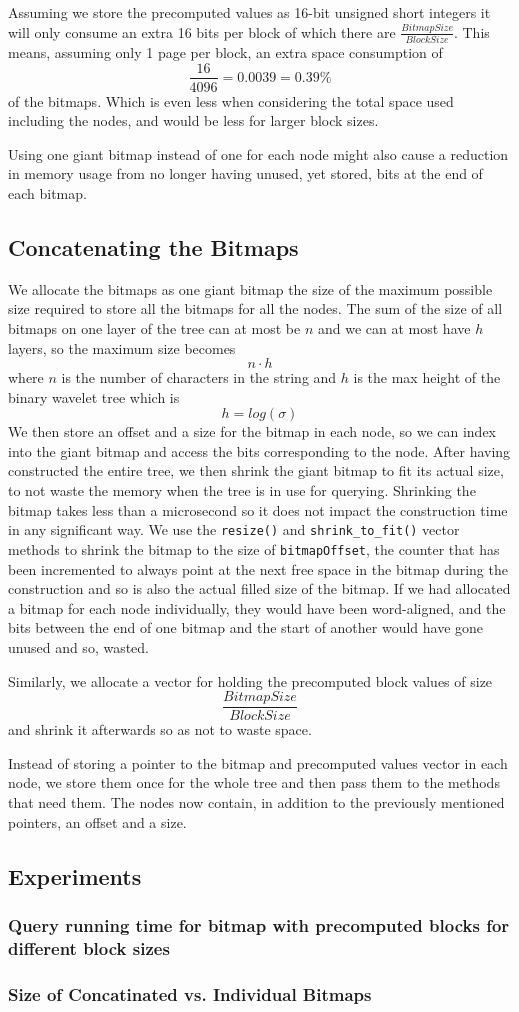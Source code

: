 Assuming we store the precomputed values as 16-bit unsigned short integers it will only consume an extra 16 bits per block of which there are $\frac{BitmapSize}{BlockSize}$.
This means, assuming only 1 page per block, an extra space consumption of
\[ \frac{16}{4096} = 0.0039 = 0.39\% \]
of the bitmaps.
Which is even less when considering the total space used including the nodes, and would be less for larger block sizes.

Using one giant bitmap instead of one for each node might also cause a reduction in memory usage from no longer having unused, yet stored, bits at the end of each bitmap.




\subsection{Concatenating the Bitmaps}
We allocate the bitmaps as one giant bitmap the size of the maximum possible size required to store all the bitmaps for all the nodes. The sum of the size of all bitmaps on one layer of the tree can at most be $n$ and we can at most have $h$ layers, so the maximum size becomes
\[n \cdot h\]
where $n$ is the number of characters in the string and $h$ is the max height of the binary wavelet tree which is
\[ h = log(\sigma) \]
We then store an offset and a size for the bitmap in each node, so we can index into the giant bitmap and access the bits corresponding to the node.
After having constructed the entire tree, we then shrink the giant bitmap to fit its actual size, to not waste the memory when the tree is in use for querying. Shrinking the bitmap takes less than a microsecond so it does not impact the construction time in any significant way. We use the \texttt{resize()} and \texttt{shrink\_to\_fit()} vector methods to shrink the bitmap to the size of \texttt{bitmapOffset}, the counter that has been incremented to always point at the next free space in the bitmap during the construction and so is also the actual filled size of the bitmap.
If we had allocated a bitmap for each node individually, they would have been word-aligned, and the bits between the end of one bitmap and the start of another would have gone unused and so, wasted.

Similarly, we allocate a vector for holding the precomputed block values of size
\[ \frac{BitmapSize}{BlockSize} \]
and shrink it afterwards so as not to waste space.

Instead of storing a pointer to the bitmap and precomputed values vector in each node, we store them once for the whole tree and then pass them to the methods that need them.
The nodes now contain, in addition to the previously mentioned pointers, an offset and a size.

\subsection{Experiments}
\subsubsection{Query running time for bitmap with precomputed blocks for different block sizes}

\subsubsection{Size of Concatinated vs. Individual Bitmaps}